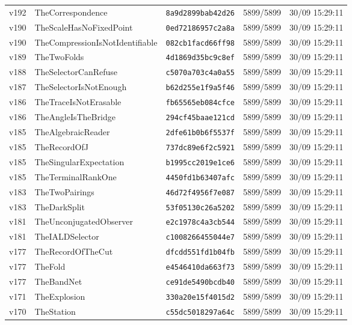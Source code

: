 \documentclass[11pt]{article}
\theoremstyle{definition}\newtheorem{deriv}{Derivação}
\begin{document}
{\begin{longtable}{@{}lllll@{}}
v192 & TheCorrespondence & \texttt{8a9d2899bab42d26} & 5899/5899 & 30/09 15:29:11 \\
v190 & TheScaleHasNoFixedPoint & \texttt{0ed72186957c2a8a} & 5899/5899 & 30/09 15:29:11 \\
v190 & TheCompressionIsNotIdentifiable & \texttt{082cb1facd66ff98} & 5899/5899 & 30/09 15:29:11 \\
v189 & TheTwoFolds & \texttt{4d1869d35bc9c8ef} & 5899/5899 & 30/09 15:29:11 \\
v188 & TheSelectorCanRefuse & \texttt{c5070a703c4a0a55} & 5899/5899 & 30/09 15:29:11 \\
v187 & TheSelectorIsNotEnough & \texttt{b62d255e1f9a5f46} & 5899/5899 & 30/09 15:29:11 \\
v186 & TheTraceIsNotErasable & \texttt{fb65565eb084cfce} & 5899/5899 & 30/09 15:29:11 \\
v186 & TheAngleIsTheBridge & \texttt{294cf45baae121cd} & 5899/5899 & 30/09 15:29:11 \\
v185 & TheAlgebraicReader & \texttt{2dfe61b0b6f5537f} & 5899/5899 & 30/09 15:29:11 \\
v185 & TheRecordOfJ & \texttt{737dc89e6f2c5921} & 5899/5899 & 30/09 15:29:11 \\
v185 & TheSingularExpectation & \texttt{b1995cc2019e1ce6} & 5899/5899 & 30/09 15:29:11 \\
v185 & TheTerminalRankOne & \texttt{4450fd1b63407afc} & 5899/5899 & 30/09 15:29:11 \\
v183 & TheTwoPairings & \texttt{46d72f4956f7e087} & 5899/5899 & 30/09 15:29:11 \\
v183 & TheDarkSplit & \texttt{53f05130c26a5202} & 5899/5899 & 30/09 15:29:11 \\
v181 & TheUnconjugatedObserver & \texttt{e2c1978c4a3cb544} & 5899/5899 & 30/09 15:29:11 \\
v181 & TheIALDSelector & \texttt{c1008266455044e7} & 5899/5899 & 30/09 15:29:11 \\
v177 & TheRecordOfTheCut & \texttt{dfcdd551fd1b04fb} & 5899/5899 & 30/09 15:29:11 \\
v177 & TheFold & \texttt{e4546410da663f73} & 5899/5899 & 30/09 15:29:11 \\
v177 & TheBandNet & \texttt{ce91de5490bcdb40} & 5899/5899 & 30/09 15:29:11 \\
v171 & TheExplosion & \texttt{330a20e15f4015d2} & 5899/5899 & 30/09 15:29:11 \\
v170 & TheStation & \texttt{c55dc5018297a64c} & 5899/5899 & 30/09 15:29:11 \\

\end{longtable}}
\end{document}
